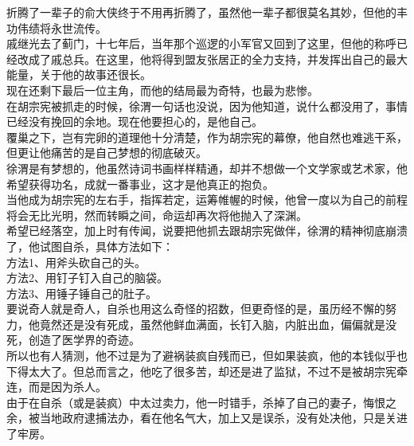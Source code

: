 \begin{multicols}{\theparacolNo}
折腾了一辈子的俞大侠终于不用再折腾了，虽然他一辈子都很莫名其妙，但他的丰功伟绩将永世流传。\\

戚继光去了蓟门，十七年后，当年那个巡逻的小军官又回到了这里，但他的称呼已经改成了戚总兵。在这里，他将得到盟友张居正的全力支持，并发挥出自己的最大能量，关于他的故事还很长。\\

现在还剩下最后一位主角，而他的结局最为奇特，也最为悲惨。\\

在胡宗宪被抓走的时候，徐渭一句话也没说，因为他知道，说什么都没用了，事情已经没有挽回的余地。现在他要担心的，是他自己。\\

覆巢之下，岂有完卵的道理他十分清楚，作为胡宗宪的幕僚，他自然也难逃干系，但更让他痛苦的是自己梦想的彻底破灭。\\

徐渭是有梦想的，他虽然诗词书画样样精通，却并不想做一个文学家或艺术家，他希望获得功名，成就一番事业，这才是他真正的抱负。\\

当他成为胡宗宪的左右手，指挥若定，运筹帷幄的时候，他曾一度以为自己的前程将会无比光明，然而转瞬之间，命运却再次将他抛入了深渊。\\

希望已经落空，加上时有传闻，说要把他抓去跟胡宗宪做伴，徐渭的精神彻底崩溃了，他试图自杀，具体方法如下：\\

方法1、用斧头砍自己的头。\\

方法2、用钉子钉入自己的脑袋。\\

方法3、用锤子锤自己的肚子。\\

要说奇人就是奇人，自杀也用这么奇怪的招数，但更奇怪的是，虽历经不懈的努力，他竟然还是没有死成，虽然他鲜血满面，长钉入脑，内脏出血，偏偏就是没死，创造了医学界的奇迹。\\

所以也有人猜测，他不过是为了避祸装疯自残而已，但如果装疯，他的本钱似乎也下得太大了。但总而言之，他吃了很多苦，却还是进了监狱，不过不是被胡宗宪牵连，而是因为杀人。\\

由于在自杀（或是装疯）中太过卖力，他一时错手，杀掉了自己的妻子，悔恨之余，被当地政府逮捕法办，看在他名气大，加上又是误杀，没有处决他，只是关进了牢房。\\


\end{multicols}
